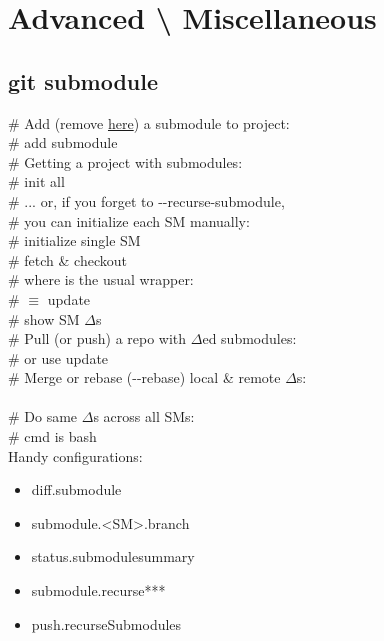 \section{Advanced \textbackslash \hspace{1mm} Miscellaneous}

\subsection*{git submodule}
\# Add (remove \href{https://stackoverflow.com/questions/1260748/how-do-i-remove-a-submodule}{here}) a submodule to project:\\
 \# add submodule \\
\# Getting a project with submodules:\\
 \# init all\\
\# ... or, if you forget to -{}-recurse-submodule, \\
\# you can initialize each SM manually:\\
 \# initialize single SM \\
 \# fetch \& checkout \\
\# where  is the usual wrapper:\\
 \# $\equiv$ update \\
 \# show SM $\Delta$s \\
\# Pull (or push) a repo with $\Delta$ed submodules:\\
 \# or use update \\
\# Merge or rebase (-{}-rebase) local \& remote $\Delta$s:\\
\\
\# Do same $\Delta$s across all SMs:\\
 \# cmd is bash\\
Handy configurations:
{\scriptsize
\begin{itemize}
\item diff.submodule
\item submodule.<SM>.branch
\item status.submodulesummary
\item submodule.recurse***
\item push.recurseSubmodules
\end{itemize}}\ \\


